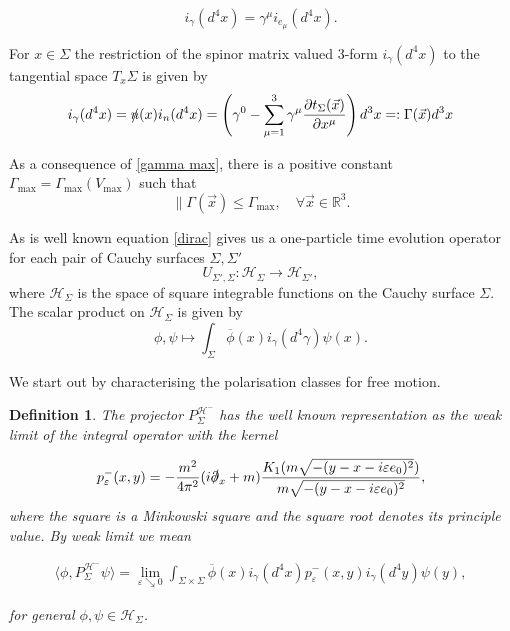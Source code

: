 \documentclass[a4paper,11pt]{article}
\newtheorem{de}{Definition}
\begin{document}
\begin{equation}
i_\gamma(d^4x)=\gamma^\mu i_{e_\mu}(d^4x).
\end{equation}

For \(x\in \Sigma\) the restriction of the spinor matrix valued 3-form \(i_\gamma(d^4x)\) to the tangential space \(T_x\Sigma\) is given by
\begin{equation}
i_\gamma(d^4x)=\slashed{n}(x)i_n(d^4x)= \left(\gamma^0-\sum_{\mu=1}^3 \gamma^\mu \frac{\partial t_\Sigma (\vec{x})}{\partial x^\mu}\right) d^3x=:\Gamma(\vec{x})d^3x
\end{equation}

As a consequence of \eqref{gamma max}, there is a positive constant \(\Gamma_{\max}=\Gamma_{\max}(V_{\max})\) such that
\begin{equation}
\|\Gamma(\vec{x})\le \Gamma_{\max}, \quad \forall \vec{x}\in\mathbb{R}^3.
\end{equation}



As is well known equation \eqref{dirac} gives us a 
one-particle time evolution operator for each pair of Cauchy surfaces \(\Sigma, \Sigma'\)
\begin{equation}
U_{\Sigma',\Sigma}:\mathcal{H}_\Sigma \rightarrow \mathcal{H}_{\Sigma'},
\end{equation}
where \(\mathcal{H}_\Sigma\) is the space of square integrable functions on the Cauchy surface \(\Sigma\). The scalar product on \(\mathcal{H}_\Sigma\)
is given by
\begin{equation}
\phi,\psi \mapsto \int_{\Sigma} \overline{\phi}(x) i_{\gamma}(d^4\gamma) \psi(x).
\end{equation}


We start out by characterising the polarisation classes for free motion.
\begin{de}
The projector \(P^{\mathcal{H}^-}_{\Sigma} \) has the well known representation as the weak limit of the integral operator 
with the kernel\cite{ivp2}

\begin{equation}
p^-_\varepsilon(x,y)= -\frac{m^2}{4\pi^2}(i\slashed{\partial}_x+m) \frac{K_1(m \sqrt{-(y-x-i \varepsilon e_0)^2})}{m \sqrt{-(y-x-i \varepsilon e_0)^2}},
\end{equation}
where the square is a Minkowski square and the square root denotes its principle value. By weak limit we mean

\begin{align}
\langle \phi, P^{\mathcal{H}^-}_{\Sigma} \psi\rangle = \lim_{\varepsilon \searrow 0} \int_{\Sigma\times \Sigma} \overline{\phi}(x) i_\gamma(d^4x) p^-_\varepsilon(x,y ) i_\gamma(d^4y) \psi(y),
\end{align}

for general \(\phi, \psi \in \mathcal{H}_\Sigma\).
\end{de}
\end{document}
